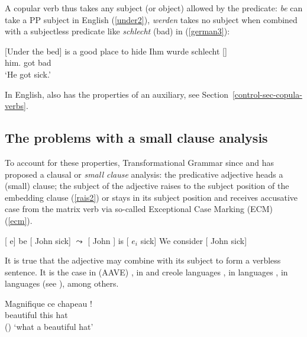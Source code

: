\documentclass[output=paper
	        ,collection
	        ,collectionchapter
 	        ,biblatex
                ,babelshorthands
                ,newtxmath
                ,draftmode
                ,colorlinks, citecolor=brown
]{langscibook}
\begin{document}
A copular verb thus takes any subject (or object) allowed by the predicate: \emph{be} can take a PP subject in English (\ref{under2}), \emph{werden} takes no subject when combined with a subjectless predicate like \emph{schlecht} (bad) in  (\ref{german3}):

\eal
\ex{}[Under the bed] is a good place to hide \label{under2}
\ex 
\gll Ihm wurde schlecht [] \citep[]{Mueller2002b}\label{german3}\\
     him.\DAT{} got bad\\
\glt `He got sick.'
\zl

 In English,  also has the properties of an auxiliary, see Section~\ref{control-sec-copula-verbs}.

\subsection{The problems with a small clause analysis}

To account for these properties, Transformational Grammar since \citet{Stowell1983} and
\citet{Chomsky1986} has proposed a clausal or \emph{small clause} analysis: the predicative
adjective heads a (small) clause; the subject of the adjective raises to the subject position of the
embedding clause (\ref{rais2}) or stays in its subject position and receives accusative case from
the matrix verb via so-called Exceptional Case Marking (ECM) (\ref{ecm}).


\begin{exe}
\ex  {}[ e] be [ John sick] $\leadsto$  [ John ] is  [ $e_{i}$ sick] \label{rais2}
\ex   We consider [ John sick] \label{ecm}
\end{exe}

It is true that the adjective may combine with its subject to form a verbless sentence. It is the
case in  (AAVE) \citep{Bender2001a}, in  \citet{Laurens2008} and creole languages
\citet{HenriandAbeille2007}, in  languages \citep{Zec87a-u}, in  languages (see
\citealp{Alqurashi:Borsley:14}), among others. 

\begin{exe}
\ex \gll Magnifique ce chapeau !\\
beautiful this hat\\\hfill{()}
\glt `what a beautiful hat'
\end{exe}
\end{document}
